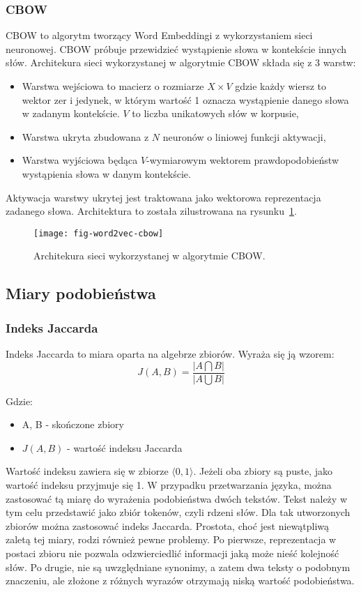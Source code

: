 \subsubsection{CBOW}
CBOW to algorytm tworzący Word Embeddingi z wykorzystaniem sieci neuronowej. CBOW próbuje przewidzieć wystąpienie słowa w kontekście innych słów. Architekura sieci wykorzystanej w algorytmie CBOW składa się z 3 warstw:
\begin{itemize}
  \item Warstwa wejściowa to macierz o rozmiarze $X \times V$ gdzie każdy wiersz to wektor zer i jedynek, w którym wartość 1 oznacza wystąpienie danego słowa w zadanym kontekście. $V$ to liczba unikatowych słów w korpusie,
  \item Warstwa ukryta zbudowana z $N$ neuronów o liniowej funkcji aktywacji,
  \item Warstwa wyjściowa będąca $V$-wymiarowym wektorem prawdopodobieństw wystąpienia słowa w danym kontekście.
\end{itemize}
Aktywacja warstwy ukrytej jest traktowana jako wektorowa reprezentacja zadanego słowa.
Architektura to została zilustrowana na rysunku~\ref{fig:cbow}.
\begin{figure}[H]
\texttt{[image: fig-word2vec-cbow]}
\centering
\caption{Architekura sieci wykorzystanej w algorytmie CBOW. %
\label{fig:cbow}}
\end{figure}

\subsection{Miary podobieństwa}

\subsubsection{Indeks Jaccarda}
Indeks Jaccarda to miara oparta na algebrze zbiorów. Wyraża się ją wzorem:
\begin{equation}
  J(A,B) = \frac{|A \bigcap B|}{|A \bigcup B|}
\end{equation}

Gdzie:
\begin{itemize}
\item A, B - skończone zbiory
\item $J(A,B)$ - wartość indeksu Jaccarda
\end{itemize}
Wartość indeksu zawiera się w zbiorze $\langle 0,1 \rangle$. Jeżeli oba zbiory są puste, jako wartość indeksu przyjmuje się 1. W przypadku przetwarzania języka, można zastosować tą miarę do wyrażenia podobieństwa dwóch tekstów. Tekst należy w tym celu przedstawić jako zbiór tokenów, czyli rdzeni słów. Dla tak utworzonych zbiorów można zastosować indeks Jaccarda.
Prostota, choć jest niewątpliwą zaletą tej miary, rodzi również pewne problemy. Po pierwsze, reprezentacja w postaci zbioru nie pozwala odzwierciedlić informacji jaką może nieść kolejność słów. Po drugie, nie są uwzględniane synonimy, a zatem dwa teksty o podobnym znaczeniu, ale złożone z różnych wyrazów otrzymają niską wartość podobieństwa.

